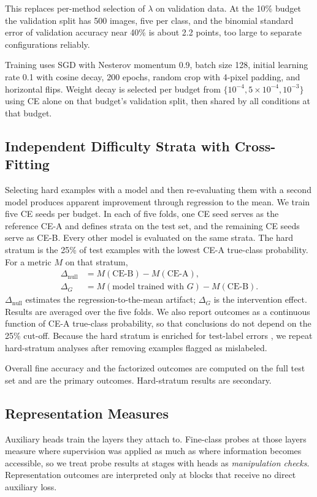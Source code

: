 \documentclass[conference]{IEEEtran}
\newcommand{\cond}[1]{\text{#1}}
\begin{document}
This replaces per-method selection of $\lambda$ on validation data. At the 10\% budget the validation split has 500 images, five per class, and the binomial standard error of validation accuracy near 40\% is about 2.2 points, too large to separate configurations reliably.

Training uses SGD with Nesterov momentum 0.9, batch size 128, initial learning rate 0.1 with cosine decay, 200 epochs, random crop with 4-pixel padding, and horizontal flips. Weight decay is selected per budget from $\{10^{-4},5\times10^{-4},10^{-3}\}$ using CE alone on that budget's validation split, then shared by all conditions at that budget.

\subsection{Independent Difficulty Strata with Cross-Fitting}
\label{sec:strata}
Selecting hard examples with a model and then re-evaluating them with a second model produces apparent improvement through regression to the mean. We train five CE seeds per budget. In each of five folds, one CE seed serves as the reference CE-A and defines strata on the test set, and the remaining CE seeds serve as CE-B. Every other model is evaluated on the same strata. The hard stratum is the 25\% of test examples with the lowest CE-A true-class probability. For a metric $M$ on that stratum,
\begin{equation}
\begin{aligned}
\Delta_{\mathrm{null}} &= M(\cond{CE-B})-M(\cond{CE-A}),\\
\Delta_{G} &= M(\text{model trained with } G)-M(\cond{CE-B}).
\end{aligned}
\label{eq:independent-null}
\end{equation}
$\Delta_{\mathrm{null}}$ estimates the regression-to-the-mean artifact; $\Delta_G$ is the intervention effect. Results are averaged over the five folds. We also report outcomes as a continuous function of CE-A true-class probability, so that conclusions do not depend on the 25\% cut-off. Because the hard stratum is enriched for test-label errors \cite{northcutt2021labelerrors}, we repeat hard-stratum analyses after removing examples flagged as mislabeled.

Overall fine accuracy and the factorized outcomes are computed on the full test set and are the primary outcomes. Hard-stratum results are secondary.

\subsection{Representation Measures}
Auxiliary heads train the layers they attach to. Fine-class probes at those layers measure where supervision was applied as much as where information becomes accessible, so we treat probe results at stages with heads as \emph{manipulation checks}. Representation outcomes are interpreted only at blocks that receive no direct auxiliary loss.
\end{document}
